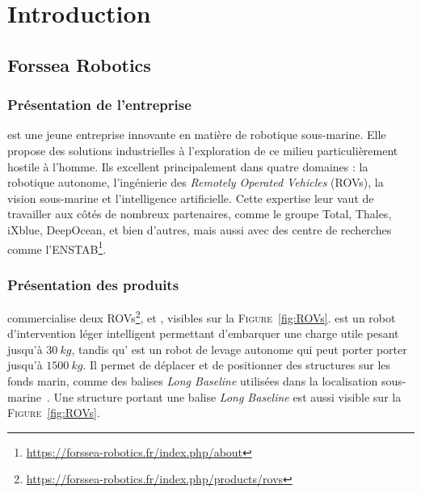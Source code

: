 \chapter{Introduction}
\label{chapter:introduction}
	
	\section{Forssea Robotics}

		\subsection{Présentation de l'entreprise}

			\forssea{} est une jeune entreprise innovante en matière de robotique sous-marine. Elle propose des solutions industrielles à l'exploration de ce milieu particulièrement hostile à l'homme. Ils excellent principalement dans quatre domaines : la robotique autonome, l'ingénierie des \textit{Remotely Operated Vehicles} (\gls{ROV}s), la vision sous-marine et l'intelligence artificielle. Cette expertise leur vaut de travailler aux côtés de nombreux partenaires, comme le groupe Total, Thales, iXblue, DeepOcean, et bien d'autres, mais aussi avec des centre de recherches comme l'\gls{ENSTAB}\footnote{\url{https://forssea-robotics.fr/index.php/about}}.

		\subsection{Présentation des produits}

			\forssea{} commercialise deux \gls{ROV}s\footnote{\url{https://forssea-robotics.fr/index.php/products/rovs}}, \argos{} et \atoll{}, visibles sur la \textsc{Figure}~\ref{fig:ROVs}. \argos{} est un robot d'intervention léger intelligent permettant d'embarquer une charge utile pesant jusqu'à $30\ kg$, tandis qu'\atoll{} est un robot de levage autonome qui peut porter porter jusqu'à $1500\ kg$. Il permet de déplacer et de positionner des structures sur les fonds marin, comme des balises \textit{Long Baseline} utilisées dans la localisation sous-marine~\cite{milne1983underwater}. Une structure portant une balise \textit{Long Baseline} est aussi visible sur la \textsc{Figure}~\ref{fig:ROVs}.

